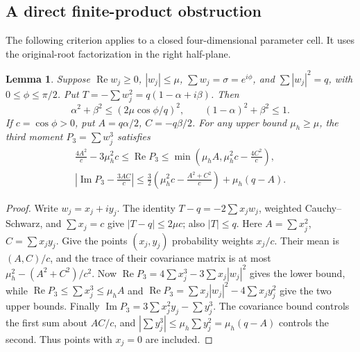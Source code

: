 \documentclass[11pt,reqno]{amsart}
\numberwithin{equation}{section}
\newtheorem{lemma}[theorem]{Lemma}
\theoremstyle{definition}
\theoremstyle{remark}
\renewcommand{\Re}{\operatorname{Re}}
\renewcommand{\Im}{\operatorname{Im}}
\begin{document}
\subsection{A direct finite-product obstruction}

The following criterion applies to a closed four-dimensional parameter
cell. It uses the original-root factorization in the right half-plane.

\begin{lemma}\label{mf:cubic-moment}
Suppose $\Re w_j\ge0$, $|w_j|\le\mu$, $\sum w_j=\sigma=e^{i\phi}$,
and $\sum|w_j|^2=q$, with $0\le\phi\le\pi/2$.
Put $T=-\sum w_j^2=q(1-\alpha+i\beta)$.
Then
\[
 \alpha^2+\beta^2\le(2\mu\cos\phi/q)^2,\qquad
 (1-\alpha)^2+\beta^2\le1.
\]
If $c=\cos\phi>0$, put $A=q\alpha/2$, $C=-q\beta/2$.
For any upper bound $\mu_h\ge\mu$, the third moment
$P_3=\sum w_j^3$ satisfies
\begin{gather}
 \frac{4A^2}{c}-3\mu_h^2c\le\Re P_3
 \le\min\left(\mu_hA,\mu_h^2c-\frac{4C^2}{c}\right),
 \label{mf:cubic-real}\\
 \left|\Im P_3-\frac{3AC}{c}\right|
 \le\frac32\left(\mu_h^2c-\frac{A^2+C^2}{c}\right)
                         +\mu_h(q-A).
 \label{mf:cubic-imag}
\end{gather}
\end{lemma}
\begin{proof}
Write $w_j=x_j+iy_j$. The identity
$T-q=-2\sum x_jw_j$, weighted Cauchy--Schwarz, and
$\sum x_j=c$ give $|T-q|\le2\mu c$; also $|T|\le q$.
Here $A=\sum x_j^2$, $C=\sum x_jy_j$.
Give the points $(x_j,y_j)$ probability weights $x_j/c$.
Their mean is $(A,C)/c$, and the trace of their covariance
matrix is at most $\mu_h^2-(A^2+C^2)/c^2$.
Now
$\Re P_3=4\sum x_j^3-3\sum x_j|w_j|^2$
gives the lower bound, while
$\Re P_3\le\sum x_j^3\le\mu_h A$ and
$\Re P_3=\sum x_j|w_j|^2-4\sum x_jy_j^2$
give the two upper bounds.
Finally $\Im P_3=3\sum x_j^2y_j-\sum y_j^3$.
The covariance bound controls the first sum about $AC/c$,
and $|\sum y_j^3|\le\mu_h\sum y_j^2=\mu_h(q-A)$
controls the second. Thus points with $x_j=0$ are included.
\end{proof}
\end{document}
